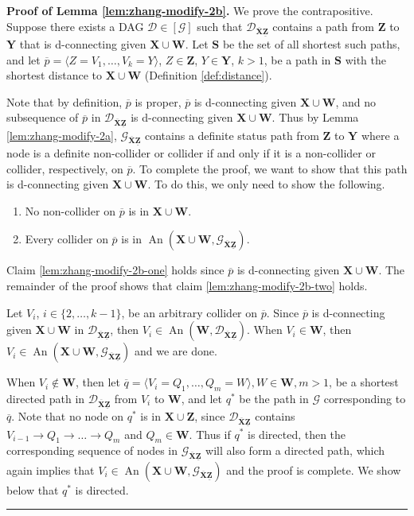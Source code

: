 \documentclass[11pt]{article}
\DeclareMathOperator{\An}{An}
\newcommand{\BlackBox}{\rule{1.5ex}{1.5ex}}  %
\newcommand{\mb}[1]{\mathbf{#1}}
\newcommand{\g}[1][G]{\mathcal{#1}}
\newenvironment{proofof}[1][]{\noindent \textbf{Proof of #1.}}{\hfill\BlackBox}
\begin{document}
\begin{proofof}[Lemma \ref{lem:zhang-modify-2b}]
    We prove the contrapositive. Suppose there exists a DAG $\g[D] \in [\g]$ such that $\g[D]_{\overline{\mb{X}}\underline{\mb{Z}}}$ contains a path from $\mb{Z}$ to $\mb{Y}$ that is d-connecting given $\mb{X} \cup \mb{W}$. Let $\mb{S}$ be the set of all shortest such paths, and let $\overline{p} = \langle Z=V_1, \dots, V_k=Y \rangle$, $Z \in \mb{Z}$, $Y \in \mb{Y}$, $k >1$, be a path in $\mb{S}$ with the shortest distance to $\mb{X} \cup \mb{W}$ (Definition \ref{def:distance}). 

    Note that by definition, $\overline{p}$ is proper, $\overline{p}$ is d-connecting given $\mb{X} \cup \mb{W}$, and no subsequence of $\overline{p}$ in $\g[D]_{\overline{\mb{X}}\underline{\mb{Z}}}$ is d-connecting given $\mb{X} \cup \mb{W}$. Thus by Lemma \ref{lem:zhang-modify-2a}, $\g_{\overline{\mb{X}}\underline{\mb{Z}}}$ contains a definite status path from $\mb{Z}$ to $\mb{Y}$ where a node is a definite non-collider or collider if and only if it is a non-collider or collider, respectively, on $\overline{p}$. To complete the proof, we want to show that this path is d-connecting given $\mb{X} \cup \mb{W}$. To do this, we only need to show the following.
    \begin{enumerate}[label=(\roman*)]
        \item\label{lem:zhang-modify-2b-one}
        No non-collider on $\overline{p}$ is in $\mb{X} \cup \mb{W}$.
        
        \item\label{lem:zhang-modify-2b-two}
        Every collider on $\overline{p}$ is in $\An(\mb{X} \cup \mb{W}, \g_{\overline{\mb{X}}\underline{\mb{Z}}})$.
    \end{enumerate}
    Claim \ref{lem:zhang-modify-2b-one} holds since $\overline{p}$ is d-connecting given $\mb{X} \cup \mb{W}$. The remainder of the proof shows that claim \ref{lem:zhang-modify-2b-two} holds.

    Let $V_i$, $i \in \{2, \dots, k-1\}$, be an arbitrary collider on $\overline{p}$. Since $\overline{p}$ is d-connecting given $\mb{X} \cup \mb{W}$ in $\g[D]_{\overline{\mb{X}}\underline{\mb{Z}}}$, then $V_i \in \An(\mb{W}, \g[D]_{\overline{\mb{X}}\underline{\mb{Z}}})$. When $V_i \in \mb{W}$, then $V_i \in \An(\mb{X} \cup \mb{W}, \g_{\overline{\mb{X}}\underline{\mb{Z}}})$ and we are done.
    
    When $V_i \notin \mb{W}$, then let $\overline{q} = \langle V_i=Q_1, \dots, Q_m=W \rangle, W \in \mb{W}, m > 1$, be a shortest directed path in $\g[D]_{\overline{\mb{X}}\underline{\mb{Z}}}$ from $V_i$ to $\mb{W}$, and let $q^*$ be the path in $\g$ corresponding to $\overline{q}$. Note that no node on $q^*$ is in $\mb{X} \cup \mb{Z}$, since $\g[D]_{\overline{\mb{X}}\underline{\mb{Z}}}$ contains $V_{i-1} \to Q_1 \to \dots \to Q_m$ and $Q_m \in \mb{W}$. Thus if $q^*$ is directed, then the corresponding sequence of nodes in $\g_{\overline{\mb{X}}\underline{\mb{Z}}}$ will also form a directed path, which again implies that $V_i \in \An(\mb{X} \cup \mb{W}, \g_{\overline{\mb{X}}\underline{\mb{Z}}})$ and the proof is complete. We show below that $q^*$ is directed.


\end{proofof}
\end{document}
